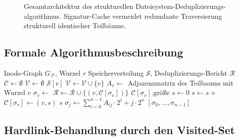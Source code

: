 ﻿\documentclass[a4paper,12pt]{article}
\theoremstyle{definition}
\begin{document}
\begin{figure}[H]
\caption{Gesamtarchitektur des strukturellen Dateisystem-Deduplizierungs-
algorithmus. Signatur-Cache vermeidet redundante Traversierung
strukturell identischer Teilb\"aume.}
\label{fig:architecture}
\end{figure}

\subsection{Formale Algorithmusbeschreibung}

\begin{algorithm}[H]
\caption{Strukturelle Dateisystem-Deduplizierung (SDD)}
\begin{algorithmic}[1]
\Require Inode-Graph $G_\mathcal{F}$, Wurzel $r$
\Ensure Speicherverteilung $\mathcal{S}$, Deduplizierungs-Bericht $\mathcal{R}$
\State $\mathcal{C} \gets \emptyset$ 
\State $\mathcal{V} \gets \emptyset$ 
     \Return $\mathcal{S}[v]$ \EndIf
    \State $\mathcal{V} \gets \mathcal{V} \cup \{v\}$
    \State $A_v \gets$ Adjazenzmatrix des Teilbaums mit Wurzel $v$
    \State $\sigma_v \gets$ 
        \State $\mathcal{R} \gets \mathcal{R} \cup \{(v, \mathcal{C}[\sigma_v])\}$ 
        \Return $\mathcal{C}[\sigma_v].\text{gr\"o\ss{}e}$
    \EndIf
    \State $s \gets 0$
        \State $s \gets s +$ 
    \EndFor
    \State $\mathcal{C}[\sigma_v] \gets (v, s)$
    \State \Return $s$
\EndFunction
{}
        \State $\sigma_j \gets \sum_{i=0}^{n-1} A_{ij} \cdot 2^i + j \cdot 2^n$
    \EndFor
    \Return $[\sigma_0, \ldots, \sigma_{n-1}]$
\EndFunction
\end{algorithmic}
\end{algorithm}

\subsection{Hardlink-Behandlung durch den Visited-Set}
\end{document}
